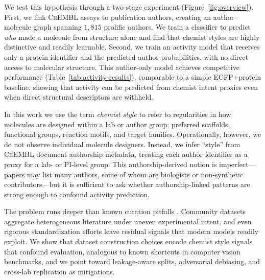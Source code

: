 \documentclass[11pt]{article}
\begin{document}
We test this hypothesis through a two-stage experiment (Figure~\ref{fig:overview}). First, we link \textsc{ChEMBL} assays to publication authors, creating an author--molecule graph spanning $1{,}815$ prolific authors. We train a classifier to predict \emph{who} made a molecule from structure alone and find that chemist styles are highly distinctive and readily learnable. Second, we train an activity model that receives only a protein identifier and the predicted author probabilities, with no direct access to molecular structure. This author-only model achieves competitive performance (Table~\ref{tab:activity-results}), comparable to a simple ECFP+protein baseline, showing that activity can be predicted from chemist intent proxies even when direct structural descriptors are withheld.

In this work we use the term \emph{chemist style} to refer to regularities in how molecules are designed within a lab or author group: preferred scaffolds, functional groups, reaction motifs, and target families. Operationally, however, we do not observe individual molecule designers. Instead, we infer ``style'' from \textsc{ChEMBL} document authorship metadata, treating each author identifier as a proxy for a lab- or PI-level group. This authorship-derived notion is imperfect---papers may list many authors, some of whom are biologists or non-synthetic contributors---but it is sufficient to ask whether authorship-linked patterns are strong enough to confound activity prediction.

The problem runs deeper than known curation pitfalls \citep{baell2010pains, fourches2010curation}. Community datasets aggregate heterogeneous literature under uneven experimental intent, and even rigorous standardization efforts \citep{bequignon2023papyrus, sun2017excape} leave residual signals that modern models readily exploit. We show that dataset construction choices encode chemist style signals that confound evaluation, analogous to known shortcuts in computer vision benchmarks, and we point toward leakage-aware splits, adversarial debiasing, and cross-lab replication as mitigations.
\end{document}
